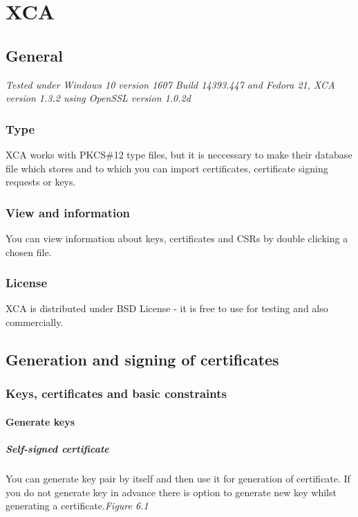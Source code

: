 \documentclass[10pt, a4paper]{report}
\begin{document}
\chapter{XCA}

\section{General}

\textit{Tested under Windows 10 version 1607 Build 14393.447 and Fedora 21, XCA version 1.3.2 using OpenSSL version 1.0.2d}

  \subsection{Type}
XCA works with PKCS\#12 type files, but it is neccessary to make their database file which stores and to which you can import certificates, certificate signing requests or keys.
  \subsection{View and information}
You can view information about keys, certificates and CSRs by double clicking a chosen file.
  \subsection{License}
XCA is distributed under BSD License - it is free to use for testing and also commercially.
  
\section{Generation and signing of certificates}

  \subsection{Keys, certificates and basic constraints}
  
    \subsubsection{Generate keys}
    
      \paragraph{Self-signed certificate}
You can generate key pair by itself and then use it for generation of certificate. If you do not generate key in advance there is option to generate new key whilst generating a certificate.\textit{{Figure 6.1}}  \\
\end{document}
